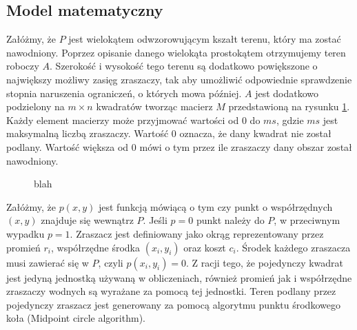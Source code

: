 \documentclass[twoside]{iisthesis}
\begin{document}
\subsection{Model matematyczny}
Załóżmy, że $P$ jest wielokątem odwzorowującym kszałt terenu, który ma zostać nawodniony. Poprzez opisanie danego wielokąta prostokątem otrzymujemy teren roboczy $A$. Szerokość i wysokość tego terenu są dodatkowo powiększone o największy możliwy zasięg zraszaczy, tak aby umożliwić odpowiednie sprawdzenie stopnia naruszenia ograniczeń, o których mowa później. $A$ jest dodatkowo podzielony na $m \times n$ kwadratów tworząc macierz $M$ przedstawioną na rysunku \ref{fig:matrix_m}. Każdy element macierzy może przyjmować wartości od 0 do $ms$, gdzie $ms$ jest maksymalną liczbą zraszaczy. Wartość 0 oznacza, że dany kwadrat nie został podlany. Wartość większa od 0 mówi o tym przez ile zraszaczy dany obszar został nawodniony.
\begin{figure}[!htb]
	\centering
	\caption{blah}
	\label{fig:matrix_m}
\end{figure}
Załóżmy, że $p(x,y)$ jest funkcją mówiącą o tym czy punkt o współrzędnych $(x, y)$ znajduje się wewnątrz $P$. Jeśli $p = 0$ punkt należy do $P$, w przeciwnym wypadku $p=1$. Zraszacz jest definiowany jako okrąg reprezentowany przez promień $r_{i}$, współrzędne środka $(x_i, y_i)$ oraz koszt $c_{i}$. Środek każdego zraszacza musi zawierać się w $P$, czyli $p(x_{i}, y_{i}) = 0$. Z racji tego, że pojedynczy kwadrat jest jedyną jednostką używaną w obliczeniach, również promień jak i współrzędne zraszaczy wodnych są wyrażane za pomocą tej jednostki. Teren podlany przez pojedynczy zraszacz jest generowany za pomocą algorytmu punktu środkowego koła (Midpoint circle algorithm).
\end{document}
